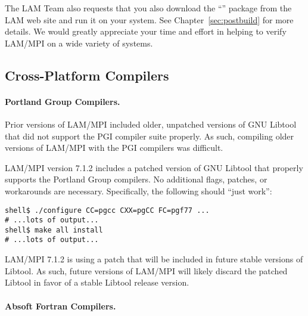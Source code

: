The LAM Team also requests that you also download the
``'' package from the LAM web site and run it on your
system.  See Chapter~\ref{sec:postbuild} for more details.  We would
greatly appreciate your time and effort in helping to verify LAM/MPI
on a wide variety of systems.


\subsection{Cross-Platform Compilers}


\paragraph{Portland Group Compilers.}


Prior versions of LAM/MPI included older, unpatched versions of GNU
Libtool that did not support the PGI compiler suite properly.  As
such, compiling older versions of LAM/MPI with the PGI compilers was
difficult.

LAM/MPI version 7.1.2 includes a patched version of GNU Libtool that
properly supports the Portland Group compilers.  No additional flags,
patches, or workarounds are necessary.  Specifically, the following
should ``just work'':

\lstset{style=lam-cmdline}
\begin{lstlisting}
shell$ ./configure CC=pgcc CXX=pgCC FC=pgf77 ...
# ...lots of output...
shell$ make all install
# ...lots of output...
\end{lstlisting}

LAM/MPI 7.1.2 is using a patch that will be included in future stable
versions of Libtool.  As such, future versions of LAM/MPI will likely
discard the patched Libtool in favor of a stable Libtool release
version.



\paragraph{Absoft Fortran Compilers.}

